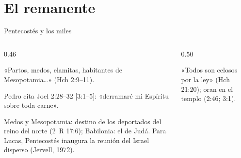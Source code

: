 \section{El remanente}
\begin{frame}{Pentecostés y los miles}
\begin{columns}[T,onlytextwidth]
\begin{column}{0.46\textwidth}\footnotesize
{}\par\smallskip
«Partos, medos, elamitas, habitantes de Mesopotamia\ldots» (Hch 2:9--11).\par\smallskip
Pedro cita Joel 2:28--32 [3:1--5]: «derramaré mi Espíritu sobre toda carne».\par
\begin{notalam}
Medos y Mesopotamia: destino de los deportados del reino del norte (2~R 17:6); Babilonia: el de Judá. Para Lucas, Pentecostés inaugura la reunión del Israel disperso (Jervell, 1972).
\end{notalam}
\end{column}
\begin{column}{0.50\textwidth}
\centering
{}
\elabpropia
\vspace{2pt}
\begin{clave}«Todos son celosos por la ley» (Hch 21:20); oran en el templo (2:46; 3:1).\end{clave}
\end{column}
\end{columns}
\end{frame}

